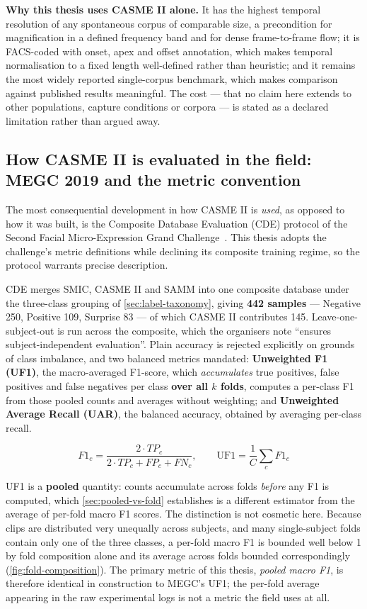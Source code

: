 \textbf{Why this thesis uses CASME II alone.} It has the highest temporal resolution of any spontaneous corpus of comparable size, a precondition for magnification in a defined frequency band and for dense frame-to-frame flow; it is FACS-coded with onset, apex and offset annotation, which makes temporal normalisation to a fixed length well-defined rather than heuristic; and it remains the most widely reported single-corpus benchmark, which makes comparison against published results meaningful. The cost --- that no claim here extends to other populations, capture conditions or corpora --- is stated as a declared limitation rather than argued away.

\subsection{How CASME II is evaluated in the field: MEGC 2019 and the metric convention}
\label{sec:megc-metrics}

The most consequential development in how CASME II is \textit{used}, as opposed to how it was built, is the Composite Database Evaluation (CDE) protocol of the Second Facial Micro-Expression Grand Challenge~\cite{see2019}. This thesis adopts the challenge's metric definitions while declining its composite training regime, so the protocol warrants precise description.

CDE merges SMIC, CASME II and SAMM into one composite database under the three-class grouping of \autoref{sec:label-taxonomy}, giving \textbf{442 samples} --- Negative 250, Positive 109, Surprise 83 --- of which CASME II contributes 145. Leave-one-subject-out is run across the composite, which the organisers note ``ensures subject-independent evaluation''. Plain accuracy is rejected explicitly on grounds of class imbalance, and two balanced metrics mandated: \textbf{Unweighted F1 (UF1)}, the macro-averaged F1-score, which \textit{accumulates} true positives, false positives and false negatives per class \textbf{over all $k$ folds}, computes a per-class F1 from those pooled counts and averages without weighting; and \textbf{Unweighted Average Recall (UAR)}, the balanced accuracy, obtained by averaging per-class recall.

\[
	F1_c = \frac{2 \cdot TP_c}{2 \cdot TP_c + FP_c + FN_c}, \qquad \text{UF1} = \frac{1}{C}\sum_c F1_c
\]

UF1 is a \textbf{pooled} quantity: counts accumulate across folds \textit{before} any F1 is computed, which \autoref{sec:pooled-vs-fold} establishes is a different estimator from the average of per-fold macro F1 scores. The distinction is not cosmetic here. Because clips are distributed very unequally across subjects, and many single-subject folds contain only one of the three classes, a per-fold macro F1 is bounded well below 1 by fold composition alone and its average across folds bounded correspondingly (\autoref{fig:fold-composition}). The primary metric of this thesis, \textit{pooled macro F1}, is therefore identical in construction to MEGC's UF1; the per-fold average appearing in the raw experimental logs is not a metric the field uses at all.

